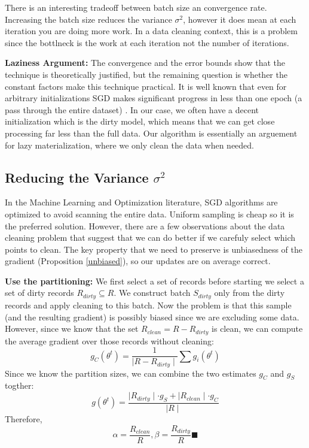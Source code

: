 There is an interesting tradeoff between batch size an convergence rate.
Increasing the batch size reduces the variance $\sigma^2$, however it does
mean at each iteration you are doing more work.
In a data cleaning context, this is a problem since the bottlneck is the work at 
each iteration not the number of iterations.

\vspace{0.5em}

\noindent\textbf{ Laziness Argument: } The convergence and the error bounds show that the technique is theoretically justified, but the remaining question is whether the constant factors make this technique practical.
It is well known that even for arbitrary initializations SGD makes significant progress in less than one epoch (a pass through the entire dataset) \cite{bottou2012stochastic}.
In our case, we often have a decent initialization which is the dirty model, which means that we can get close processing far less than the full data.
Our algorithm is essentially an arguement for lazy materialization, where we only clean the data when needed.

\subsection{Reducing the Variance $\sigma^2$}\label{dist-samp}
In the Machine Learning and Optimization literature, SGD algorithms are optimized to avoid scanning the entire data.
Uniform sampling is cheap so it is the preferred solution.
However, there are a few observations about the data cleaning problem that suggest that we can do better if we carefuly select which points to clean.
The key property that we need to preserve is unbiasedness of the gradient (Proposition \ref{unbiased}), so our updates are on average correct.

\vspace{0.5em}

\noindent\textbf{Use the partitioning: }
We first select a set of records before starting we select a set of dirty records $R_{dirty} \subseteq R$. 
We construct batch $S_{dirty}$ only from the dirty records and apply cleaning to this batch.
Now the problem is that this sample (and the resulting gradient) is possibly biased since we are excluding some data.
However, since we know that the set $R_{clean} = R - R_{dirty}$ is clean, we can compute the average gradient over those records without cleaning:
\[
g_C(\theta^{t}) = \frac{1}{\mid R - R_{dirty} \mid} \sum g_i(\theta^{t})
\]
Since we know the partition sizes, we can combine the two estimates $g_C$ and $g_S$ togther:
\[
g(\theta^{t}) = \frac{\mid R_{dirty} \mid \cdot g_S + \mid R_{clean} \mid \cdot g_C  }{\mid R \mid}
\]
Therefore,
\[
\alpha = \frac{R_{clean}}{R}, \beta = \frac{R_{dirty}}{R} \blacksquare
\]

